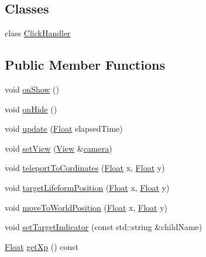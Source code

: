 \subsection*{Classes}
\begin{DoxyCompactItemize}
\item 
class \hyperlink{classZeta_1_1Player_1_1ClickHandler}{Click\+Handler}
\end{DoxyCompactItemize}
\subsection*{Public Member Functions}
\begin{DoxyCompactItemize}
\item 
void \hyperlink{classZeta_1_1Player_aa5228f99584e10fbbca521ce588b2320}{on\+Show} ()
\item 
void \hyperlink{classZeta_1_1Player_a30802e9024cf58afddaed02ad760649c}{on\+Hide} ()
\item 
void \hyperlink{classZeta_1_1Player_aa1da2b76db5db0367d613f9234f08a8a}{update} (\hyperlink{namespaceZeta_a1e0a1265f9b3bd3075fb0fabd39088ba}{Float} elapsed\+Time)
\item 
void \hyperlink{classZeta_1_1Player_a4cc40236224bd9dab47e52b80983b793}{set\+View} (\hyperlink{classZeta_1_1View}{View} \&\hyperlink{classZeta_1_1Player_a6c696154bc9063a4ec37dc76ddae56e3}{camera})
\item 
void \hyperlink{classZeta_1_1Player_acda5df80136c21ea267dda5b2423bdb7}{teleport\+To\+Cordinates} (\hyperlink{namespaceZeta_a1e0a1265f9b3bd3075fb0fabd39088ba}{Float} x, \hyperlink{namespaceZeta_a1e0a1265f9b3bd3075fb0fabd39088ba}{Float} y)
\item 
void \hyperlink{classZeta_1_1Player_a9e14088502aa7ba7bd899185a73e2d30}{target\+Lifeform\+Position} (\hyperlink{namespaceZeta_a1e0a1265f9b3bd3075fb0fabd39088ba}{Float} x, \hyperlink{namespaceZeta_a1e0a1265f9b3bd3075fb0fabd39088ba}{Float} y)
\item 
void \hyperlink{classZeta_1_1Player_a27bda60271dd38274107ab52ad99061f}{move\+To\+World\+Position} (\hyperlink{namespaceZeta_a1e0a1265f9b3bd3075fb0fabd39088ba}{Float} x, \hyperlink{namespaceZeta_a1e0a1265f9b3bd3075fb0fabd39088ba}{Float} y)
\item 
void \hyperlink{classZeta_1_1Player_a003ca959b1351f9bf42a572c4a3faac3}{set\+Target\+Indicator} (const std\+::string \&child\+Name)
\item 
\hyperlink{namespaceZeta_a1e0a1265f9b3bd3075fb0fabd39088ba}{Float} \hyperlink{classZeta_1_1Player_a6267d20751e93d94991eaf403950b1b2}{get\+Xp} () const 

\end{DoxyCompactItemize}
